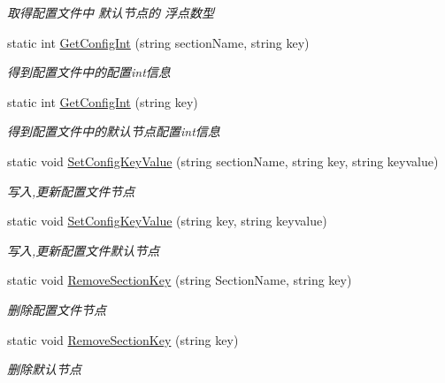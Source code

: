 \begin{DoxyCompactItemize}
\begin{DoxyCompactList}\small\item\em 取得配置文件中 默认节点的 浮点数型 \end{DoxyCompactList}\item 
static int \hyperlink{class_x_c_l_net_tools_1_1_x_m_l_1_1_config_class_ad425ce0eba3934ccc1d52ea684d2e0b8}{Get\+Config\+Int} (string section\+Name, string key)
\begin{DoxyCompactList}\small\item\em 得到配置文件中的配置int信息 \end{DoxyCompactList}\item 
static int \hyperlink{class_x_c_l_net_tools_1_1_x_m_l_1_1_config_class_a6324bda22efeeb66fa68217f6b4e6716}{Get\+Config\+Int} (string key)
\begin{DoxyCompactList}\small\item\em 得到配置文件中的默认节点配置int信息 \end{DoxyCompactList}\item 
static void \hyperlink{class_x_c_l_net_tools_1_1_x_m_l_1_1_config_class_a5d6a2482e702b6360c84003d98fae83d}{Set\+Config\+Key\+Value} (string section\+Name, string key, string keyvalue)
\begin{DoxyCompactList}\small\item\em 写入,更新配置文件节点 \end{DoxyCompactList}\item 
static void \hyperlink{class_x_c_l_net_tools_1_1_x_m_l_1_1_config_class_a993ce9110b05388e2d69044f65606f60}{Set\+Config\+Key\+Value} (string key, string keyvalue)
\begin{DoxyCompactList}\small\item\em 写入,更新配置文件默认节点 \end{DoxyCompactList}\item 
static void \hyperlink{class_x_c_l_net_tools_1_1_x_m_l_1_1_config_class_a6c39cd2a0133625d46b1e319aa1cdf92}{Remove\+Section\+Key} (string Section\+Name, string key)
\begin{DoxyCompactList}\small\item\em 删除配置文件节点 \end{DoxyCompactList}\item 
static void \hyperlink{class_x_c_l_net_tools_1_1_x_m_l_1_1_config_class_a0f5d67dc3b088f2efc9a9b1118134a0b}{Remove\+Section\+Key} (string key)
\begin{DoxyCompactList}\small\item\em 删除默认节点 \end{DoxyCompactList}\end{DoxyCompactItemize}


